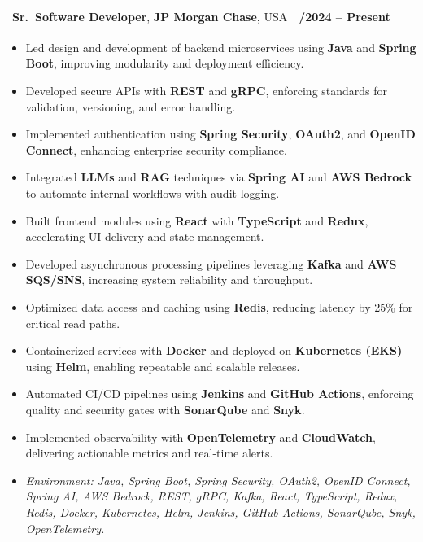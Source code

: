 \documentclass[letterpaper,11pt]{article}
\makeatletter
\newcommand{\resumeItem}[1]{
  \item\footnotesize{
    {#1 \vspace{-2pt}}
  }
}
\newcommand{\resumeSubheading}[4]{
  \vspace{-2pt}\item
    \begin{tabular*}{1.0\textwidth}[t]{l@{\extracolsep{\fill}}r}
      \textbf{\fontsize{10pt}{14pt}\selectfont #3}, \textbf{\fontsize{10pt}{14pt}\selectfont #1}, \fontsize{10pt}{14pt}\selectfont #4 & \textbf{\fontsize{10pt}{14pt}\selectfont #2} \\
    \end{tabular*}\vspace{-7pt}
}
\newcommand{\resumeItemListStart}{\begin{itemize}[leftmargin=*]}
\newcommand{\resumeItemListEnd}{\end{itemize}\vspace{-5pt}}
\makeatother
\begin{document}
\resumeSubheading
{JP Morgan Chase}{09/2024 -- Present}
{Sr.\ Software Developer}{USA}
\resumeItemListStart
  \resumeItem{Led design and development of backend microservices using \textbf{Java} and \textbf{Spring Boot}, improving modularity and deployment efficiency.}
  \resumeItem{Developed secure APIs with \textbf{REST} and \textbf{gRPC}, enforcing standards for validation, versioning, and error handling.}
  \resumeItem{Implemented authentication using \textbf{Spring Security}, \textbf{OAuth2}, and \textbf{OpenID Connect}, enhancing enterprise security compliance.}
  \resumeItem{Integrated \textbf{LLMs} and \textbf{RAG} techniques via \textbf{Spring AI} and \textbf{AWS Bedrock} to automate internal workflows with audit logging.}
  \resumeItem{Built frontend modules using \textbf{React} with \textbf{TypeScript} and \textbf{Redux}, accelerating UI delivery and state management.}
  \resumeItem{Developed asynchronous processing pipelines leveraging \textbf{Kafka} and \textbf{AWS SQS/SNS}, increasing system reliability and throughput.}
  \resumeItem{Optimized data access and caching using \textbf{Redis}, reducing latency by 25\% for critical read paths.}
  \resumeItem{Containerized services with \textbf{Docker} and deployed on \textbf{Kubernetes (EKS)} using \textbf{Helm}, enabling repeatable and scalable releases.}
  \resumeItem{Automated CI/CD pipelines using \textbf{Jenkins} and \textbf{GitHub Actions}, enforcing quality and security gates with \textbf{SonarQube} and \textbf{Snyk}.}
  \resumeItem{Implemented observability with \textbf{OpenTelemetry} and \textbf{CloudWatch}, delivering actionable metrics and real-time alerts.}
  \resumeItem{\textit{Environment: Java, Spring Boot, Spring Security, OAuth2, OpenID Connect, Spring AI, AWS Bedrock, REST, gRPC, Kafka, React, TypeScript, Redux, Redis, Docker, Kubernetes, Helm, Jenkins, GitHub Actions, SonarQube, Snyk, OpenTelemetry.}}
\resumeItemListEnd
\end{document}
